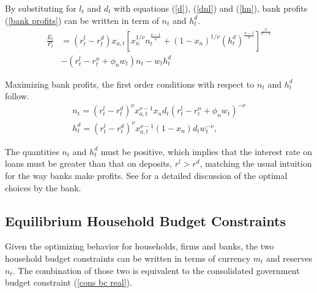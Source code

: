 \documentclass[]{article}
\begin{document}
By substituting for $l_{t}$ and $d_{t}$ with equations (\ref{d}), (\ref{dnl}) and (\ref{hn}), bank profits (\ref{bank profits}) can be written in term of $n_{t}$ and $h_{t}^{d}$.
\begin{equation}
\begin{split}
\frac{E_{t}}{P_{t}}& =(r_{t}^l-r_{t}^d)x_{a,t}\left[x_{n}^{1/\nu}n_{t}^{\frac{\nu-1}{\nu}}+(1-x_{n})^{1/\nu}(h_{t}^{d})^{\frac{\nu-1}{\nu}}\right]^{\frac{\nu}{\nu-1}} \\
&-(r_{t}^{l}-r_{t}^{n}+\phi_{n}w_{t})n_{t}-w_{t}h_{t}^{d}
\end{split}
\end{equation}

Maximizing bank profits, the first order conditions with respect to $n_{t}$ and $h_{t}^{d}$ follow.
\begin{eqnarray}
  n_{t}=(r^l_{t}-r^d_{t})^{\nu}x_{a,t}^{\nu-1}x_{n}d_{t}(r^{l}_{t}-r^{n}_{t}+\phi_{n}w_{t})^{-\nu}  \label{foc n} \\
  h^{d}_{t}=(r^l_{t}-r^d_{t})^{\nu}x_{a,t}^{\nu-1}(1-x_{n})d_{t}w_{t}^{-\nu},  \label{foc hd}
\end{eqnarray}

The quantities $n_{t}$ and $h_{t}^{d}$ must be positive, which implies that the interest rate on loans must be greater than that on deposits, $r^l>r^d$, matching the usual intuition for the way banks make profits. See \textcite{ireland2014macroeconomics} for a detailed discussion of the optimal choices by the bank.

\subsection{Equilibrium Household Budget Constraints}

Given the optimizing behavior for households, firms and banks, the two household budget constraints can be written in terms of currency $m_{t}$ and reserves $n_{t}$. The combination of those two is equivalent to the consolidated government budget constraint (\ref{cons bc real}).
\end{document}
